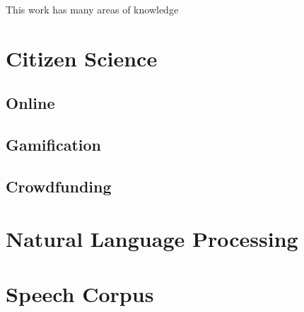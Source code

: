 This work has many areas of knowledge

\section{Citizen Science}

\subsection{Online}
\subsection{Gamification}
\subsection{Crowdfunding}

\section{Natural Language Processing}

\subsection{}

\section{Speech Corpus}
